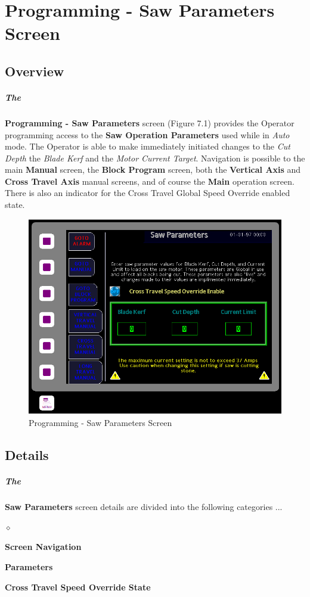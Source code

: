 \chapter{Programming - Saw Parameters Screen}
\section{Overview}\paragraph*{The}\textbf{Programming - Saw Parameters} screen (Figure 7.1) provides the Operator programming access to the \textbf{Saw Operation Parameters} used while in \textit{Auto} mode. The Operator is able to make immediately initiated changes to the \textit{Cut Depth} the \textit{Blade Kerf} and the \textit{Motor Current Target}. Navigation is possible to the main \textbf{Manual} screen, the \textbf{Block Program} screen, both the \textbf{Vertical Axis} and \textbf{Cross Travel Axis} manual screens, and of course the \textbf{Main} operation screen. There is also an indicator for the Cross Travel Global Speed Override enabled state.
\begin{figure}
	\centering
	\includegraphics[width=0.5\linewidth]{screen-captures/program/pgm-saw-info}
	\caption{Programming - Saw Parameters Screen}
	\label{fig:prg-saw-param}
\end{figure}
\section{Details}\paragraph*{The}\textbf{Saw Parameters} screen details are divided into the following categories ...
\begin{list}{$\diamond$}{}
	\item \textbf{Screen Navigation}
	\item \textbf{Parameters}
	\item \textbf{Cross Travel Speed Override State}
\end{list}
\pagebreak
